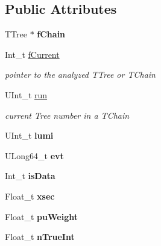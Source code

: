 \subsection*{Public Attributes}
\begin{DoxyCompactItemize}
\item 
\hypertarget{classMiniTree_a0c97f651de12609689b329ab80dd98e0}{}\label{classMiniTree_a0c97f651de12609689b329ab80dd98e0} 
T\+Tree $\ast$ {\bfseries f\+Chain}
\item 
\hypertarget{classMiniTree_a90b874da7e2f6e289c3ba7152b69792e}{}\label{classMiniTree_a90b874da7e2f6e289c3ba7152b69792e} 
Int\+\_\+t \hyperlink{classMiniTree_a90b874da7e2f6e289c3ba7152b69792e}{f\+Current}
\begin{DoxyCompactList}\small\item\em pointer to the analyzed T\+Tree or T\+Chain \end{DoxyCompactList}\item 
\hypertarget{classMiniTree_ab90e1ec5a34af0b5982dab5656b3058e}{}\label{classMiniTree_ab90e1ec5a34af0b5982dab5656b3058e} 
U\+Int\+\_\+t \hyperlink{classMiniTree_ab90e1ec5a34af0b5982dab5656b3058e}{run}
\begin{DoxyCompactList}\small\item\em current Tree number in a T\+Chain \end{DoxyCompactList}\item 
\hypertarget{classMiniTree_a9f21223718a805a6a14c00cdf39f00fd}{}\label{classMiniTree_a9f21223718a805a6a14c00cdf39f00fd} 
U\+Int\+\_\+t {\bfseries lumi}
\item 
\hypertarget{classMiniTree_a5e4ea3675684e31e1e1cb50655d64196}{}\label{classMiniTree_a5e4ea3675684e31e1e1cb50655d64196} 
U\+Long64\+\_\+t {\bfseries evt}
\item 
\hypertarget{classMiniTree_a76af5d6ca480158abc80c8c3a3287d91}{}\label{classMiniTree_a76af5d6ca480158abc80c8c3a3287d91} 
Int\+\_\+t {\bfseries is\+Data}
\item 
\hypertarget{classMiniTree_a8f0ec78026274bf190380c13b5ae69e4}{}\label{classMiniTree_a8f0ec78026274bf190380c13b5ae69e4} 
Float\+\_\+t {\bfseries xsec}
\item 
\hypertarget{classMiniTree_a2aabee18b825b33275b3998986ef3b45}{}\label{classMiniTree_a2aabee18b825b33275b3998986ef3b45} 
Float\+\_\+t {\bfseries pu\+Weight}
\item 
\hypertarget{classMiniTree_af6e4ff21c92240e3009e842018d90ebc}{}\label{classMiniTree_af6e4ff21c92240e3009e842018d90ebc} 
Float\+\_\+t {\bfseries n\+True\+Int}
\item 

\end{DoxyCompactItemize}
